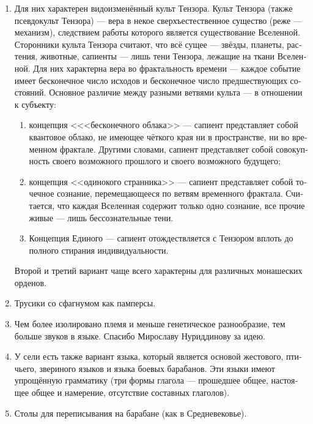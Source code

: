 \documentclass[a4paper,12pt,fleqn]{book}\usepackage{cooltooltips}\usepackage{polyglossia}\setdefaultlanguage[babelshorthands=true]{russian}\setotherlanguage{english}\defaultfontfeatures{Ligatures=TeX,Mapping=tex-text} \usepackage{xcolor}\definecolor{lightgray}{HTML}{bbbbbb}\color{lightgray}\newcommand{\ml}[3]{\textenglish{\textcolor{black}{#3}}}
\begin{document}
{\begin{enumerate}
\item Для них характерен видоизменённый культ Тензора.
Культ Тензора (также псевдокульт Тензора) --- вера в некое сверхъестественное существо (реже --- механизм), следствием работы которого является существование Вселенной.
Сторонники культа Тензора считают, что всё сущее --- звёзды, планеты, растения, животные, сапиенты --- лишь тени Тензора, лежащие на ткани Вселенной.
Для них характерна вера во фрактальность времени --- каждое событие имеет бесконечное число исходов и бесконечное число предшествующих состояний.
Основное различие между разными ветвями культа --- в отношении к субъекту:

\begin{enumerate}
\item концепция <<<бесконечного облака>> --- сапиент представляет собой квантовое облако, не имеющее чёткого края ни в пространстве, ни во временном фрактале.
Другими словами, сапиент представляет собой совокупность своего возможного прошлого и своего возможного будущего;
\item концепция <<одинокого странника>> --- сапиент представляет собой точечное сознание, перемещающееся по ветвям временного фрактала.
Считается, что каждая Вселенная содержит только одно сознание, все прочие живые --- лишь бессознательные тени.
\item Концепция Единого --- сапиент отождествляется с Тензором вплоть до полного стирания индивидуальности.                                                                                                            \end{enumerate}

Второй и третий вариант чаще всего характерны для различных монашеских орденов.

\item Трусики со сфагнумом как памперсы.

\item Чем более изолировано племя и меньше генетическое разнообразие, тем больше звуков в языке.
Спасибо Мирославу Нуриддинову за идею.

\item У сели есть также вариант языка, который является основой жестового, птичьего, звериного языков и языка боевых барабанов.
Эти языки имеют упрощённую грамматику (три формы глагола --- прошедшее общее, настоящее общее и намерение, отсутствие составных глаголов).

\item Столы для переписывания на барабане (как в Средневековье).


\end{enumerate}}
\end{document}
